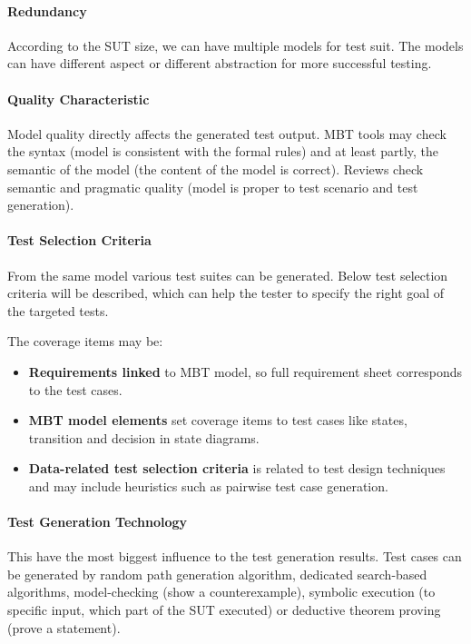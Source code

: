 \paragraph{Redundancy}
According to the SUT size, we can have multiple models for test suit. The models can have different aspect or different abstraction for more successful testing.

\paragraph{Quality Characteristic}
Model quality directly affects the generated test output. MBT tools may check the syntax (model is consistent with the formal rules) and at least partly, the semantic of the model (the content of the model is correct). Reviews check semantic and pragmatic quality (model is proper to test scenario and test generation).

\paragraph{Test Selection Criteria}
From the same model various test suites can be generated. Below test selection criteria will be described, which can help the tester to specify the right goal of the targeted tests. 

The coverage items may be:
\begin{itemize}
	\item \textbf{Requirements linked} to MBT model, so full requirement sheet corresponds to the test cases.
	\item \textbf{MBT model elements} set coverage items to test cases like states, transition and decision in state diagrams.
	\item \textbf{Data-related test selection criteria} is related to test design techniques and may include heuristics such as pairwise test case generation.
\end{itemize}

\paragraph{Test Generation Technology}
This have the most biggest influence to the test generation results. Test cases can be generated by random path generation algorithm, dedicated search-based algorithms, model-checking (show a counterexample), symbolic execution (to specific input, which part of the SUT executed) or deductive theorem proving (prove a statement).

